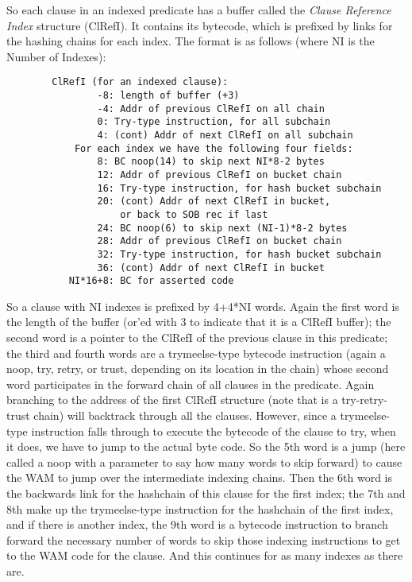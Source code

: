 \documentclass[11pt]{article}
\begin{document}
So each clause in an indexed predicate has a buffer called the {\em
Clause Reference Index} structure (ClRefI).  It contains its bytecode,
which is prefixed by links for the hashing chains for each index.  The
format is as follows (where NI is the Number of Indexes):
\begin{verbatim}
        ClRefI (for an indexed clause):
                -8: length of buffer (+3)
                -4: Addr of previous ClRefI on all chain
                0: Try-type instruction, for all subchain
                4: (cont) Addr of next ClRefI on all subchain
            For each index we have the following four fields: 
                8: BC noop(14) to skip next NI*8-2 bytes
                12: Addr of previous ClRefI on bucket chain
                16: Try-type instruction, for hash bucket subchain
                20: (cont) Addr of next ClRefI in bucket,
                    or back to SOB rec if last
                24: BC noop(6) to skip next (NI-1)*8-2 bytes
                28: Addr of previous ClRefI on bucket chain
                32: Try-type instruction, for hash bucket subchain
                36: (cont) Addr of next ClRefI in bucket
           NI*16+8: BC for asserted code
\end{verbatim}

So a clause with NI indexes is prefixed by 4+4*NI words.  Again the
first word is the length of the buffer (or'ed with 3 to indicate that
it is a ClRefI buffer); the second word is a pointer to the ClRefI of
the previous clause in this predicate; the third and fourth words are
a trymeelse-type bytecode instruction (again a noop, try, retry, or
trust, depending on its location in the chain) whose second word
participates in the forward chain of all clauses in the predicate.
Again branching to the address of the first ClRefI structure (note
that is a try-retry-trust chain) will backtrack through all the
clauses.  However, since a trymeelse-type instruction falls through to
execute the bytecode of the clause to try, when it does, we have to
jump to the actual byte code.  So the 5th word is a jump (here called
a noop with a parameter to say how many words to skip forward) to
cause the WAM to jump over the intermediate indexing chains.  Then the
6th word is the backwards link for the hashchain of this clause for
the first index; the 7th and 8th make up the trymeelse-type
instruction for the hashchain of the first index, and if there is
another index, the 9th word is a bytecode instruction to branch
forward the necessary number of words to skip those indexing
instructions to get to the WAM code for the clause.  And this
continues for as many indexes as there are.
\end{document}

